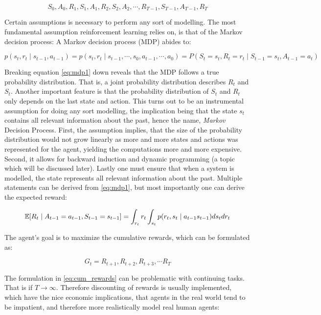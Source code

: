 \begin{equation}
    S_0, A_0, R_1, S_1, A_1, R_2, S_2, A_2, \cdots ,R_{T-1}, S_{T-1}, A_{T-1}, R_{T}
\end{equation}

Certain assumptions is necessary to perform any sort of modelling. The most fundamental assumption reinforcement learning relies on, is that of the Markov decision process: A Markov decision process (MDP) abides to:

\begin{equation}\label{eq:mdp1}
    p(s_t, r_t \mid s_{t-1},  a_{t-1}) = p(s_t, r_t \mid s_{t-1},\cdots, s_{0}, a_{t-1}, \cdots, a_{0}) = P(S_t = s_t, R_t = r_t \mid S_{t-1} = s_t, A_{t-1} = a_t)
\end{equation}

Breaking equation \eqref{eq:mdp1} down reveals that the MDP follows a true probability distribution. That is, a joint probability distribution describes $R_t$ and $S_t$. Another important feature is that the probability distribution of $S_t$ and $R_t$ only depends on the last state and action. This turns out to be an instrumental assumption for doing any sort modelling, the implication being that the state $s_t$ contains all relevant information about the past, hence the name, \textit{Markov} Decision Process. First, the assumption implies, that the size of the probability distribution would not grow linearly as more and more states and actions was represented for the agent, yielding the computations more and more expensive. Second, it allows for backward induction and dynamic programming (a topic which will be discussed later).  Lastly one must ensure that when a system is modelled, the state represents all relevant information about the past. Multiple statements can be derived from \eqref{eq:mdp1}, but most importantly one can derive the expected reward:

\begin{equation}
    \mathbb{E}[R_t \mid A_{t-1} = a_{t-1}, S_{t-1} = {s_{t-1}}] = \int_{r_t} r_t \int_{s_t} p(r_t, s_t \mid a_{t-1} s_{t-1}) d s_t d r_t 
\end{equation}

The agent's goal is to maximize the cumulative rewards, which can be formulated as:

\begin{equation}\label{eq:cum_rewards}
   G_t = R_{t+1}, R_{t+2}, R_{t+3}, \cdots R_{T}
\end{equation}

The formulation in \eqref{eq:cum_rewards} can be problematic with continuing tasks. That is if $T \rightarrow \infty$. Therefore discounting of rewards is usually implemented, which have the nice economic implications, that agents in the real world tend to be impatient, and therefore more realistically model real human agents:

